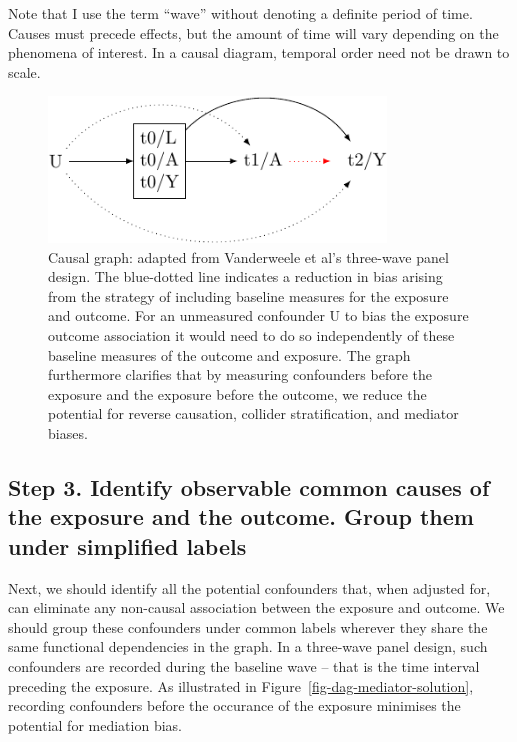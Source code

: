 \documentclass[
  singlecolumn]{report}
\begin{document}
Note that I use the term ``wave'' without denoting a definite period of
time. Causes must precede effects, but the amount of time will vary
depending on the phenomena of interest. In a causal diagram, temporal
order need not be drawn to scale.

\begin{figure}

{\centering \includegraphics[width=0.8\textwidth,height=\textheight]{causal-dags_files/figure-pdf/fig-dag-6-1.pdf}

}

\caption{\label{fig-dag-6}Causal graph: adapted from Vanderweele et al's
three-wave panel design. The blue-dotted line indicates a reduction in
bias arising from the strategy of including baseline measures for the
exposure and outcome. For an unmeasured confounder U to bias the
exposure outcome association it would need to do so independently of
these baseline measures of the outcome and exposure. The graph
furthermore clarifies that by measuring confounders before the exposure
and the exposure before the outcome, we reduce the potential for reverse
causation, collider stratification, and mediator biases.}

\end{figure}

\hypertarget{step-3.-identify-observable-common-causes-of-the-exposure-and-the-outcome.-group-them-under-simplified-labels}{%
\subsection{Step 3. Identify observable common causes of the exposure
and the outcome. Group them under simplified
labels}\label{step-3.-identify-observable-common-causes-of-the-exposure-and-the-outcome.-group-them-under-simplified-labels}}

Next, we should identify all the potential confounders that, when
adjusted for, can eliminate any non-causal association between the
exposure and outcome. We should group these confounders under common
labels wherever they share the same functional dependencies in the
graph. In a three-wave panel design, such confounders are recorded
during the baseline wave -- that is the time interval preceding the
exposure. As illustrated in Figure~\ref{fig-dag-mediator-solution},
recording confounders before the occurance of the exposure minimises the
potential for mediation bias.
\end{document}
